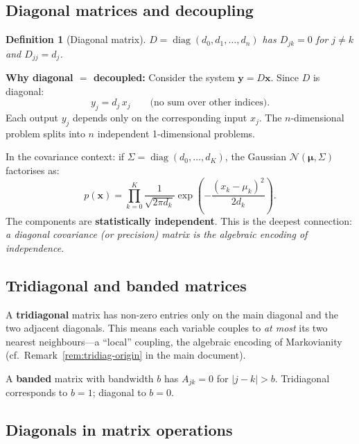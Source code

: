 \documentclass[11pt,a4paper]{article}
\newtheorem{definition}[theorem]{Definition}
\newcommand{\diag}{\operatorname{diag}}
\begin{document}
\subsection{Diagonal matrices and decoupling}

\begin{definition}[Diagonal matrix]
$D = \diag(d_0, d_1, \dots, d_n)$ has $D_{jk} = 0$ for $j \neq k$ and $D_{jj} = d_j$.
\end{definition}

\textbf{Why diagonal $=$ decoupled:}  Consider the system $\mathbf{y} = D\mathbf{x}$.  Since $D$ is diagonal:
\begin{equation}
  y_j = d_j\,x_j \qquad \text{(no sum over other indices)}.
\end{equation}
Each output $y_j$ depends only on the corresponding input $x_j$.  The $n$-dimensional problem splits into $n$ independent 1-dimensional problems.

In the covariance context: if $\Sigma = \diag(d_0, \dots, d_K)$, the Gaussian $\mathcal{N}(\bm{\mu}, \Sigma)$ factorises as:
\begin{equation}
  p(\mathbf{x}) = \prod_{k=0}^{K} \frac{1}{\sqrt{2\pi d_k}}\exp\!\left(-\frac{(x_k - \mu_k)^2}{2d_k}\right).
\end{equation}
The components are \textbf{statistically independent}.  This is the deepest connection: \emph{a diagonal covariance (or precision) matrix is the algebraic encoding of independence}.

\subsection{Tridiagonal and banded matrices}

A \textbf{tridiagonal} matrix has non-zero entries only on the main diagonal and the two adjacent diagonals.  This means each variable couples to \emph{at most} its two nearest neighbours---a ``local'' coupling, the algebraic encoding of Markovianity (cf.\ Remark~\ref{rem:tridiag-origin} in the main document).

A \textbf{banded} matrix with bandwidth $b$ has $A_{jk} = 0$ for $|j-k| > b$.  Tridiagonal corresponds to $b = 1$; diagonal to $b = 0$.

\subsection{Diagonals in matrix operations}
\end{document}
